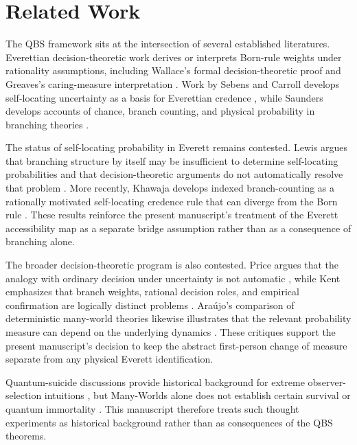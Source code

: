 \section{Related Work}

The QBS framework sits at the intersection of several established literatures. Everettian decision-theoretic work derives or interprets Born-rule weights under rationality assumptions, including Wallace's formal decision-theoretic proof \cite{wallace2009born} and Greaves's caring-measure interpretation \cite{greaves2004deutsch}. Work by Sebens and Carroll develops self-locating uncertainty as a basis for Everettian credence \cite{sebenscarroll2018selflocating}, while Saunders develops accounts of chance, branch counting, and physical probability in branching theories \cite{saunders2010chance,saunders2021probability,saunders2021branchcounting,saunders2026physicalprobability}.

The status of self-locating probability in Everett remains contested. Lewis argues that branching structure by itself may be insufficient to determine self-locating probabilities and that decision-theoretic arguments do not automatically resolve that problem \cite{lewis2009selflocation}. More recently, Khawaja develops indexed branch-counting as a rationally motivated self-locating credence rule that can diverge from the Born rule \cite{khawaja2026branchcounting}. These results reinforce the present manuscript's treatment of the Everett accessibility map as a separate bridge assumption rather than as a consequence of branching alone.

The broader decision-theoretic program is also contested. Price argues that the analogy with ordinary decision under uncertainty is not automatic \cite{price2006probability,price2010decisions}, while Kent emphasizes that branch weights, rational decision roles, and empirical confirmation are logically distinct problems \cite{kent2010oneworld}. Ara\'ujo's comparison of deterministic many-world theories likewise illustrates that the relevant probability measure can depend on the underlying dynamics \cite{araujo2019deterministic}. These critiques support the present manuscript's decision to keep the abstract first-person change of measure separate from any physical Everett identification.

Quantum-suicide discussions provide historical background for extreme observer-selection intuitions \cite{tegmark1997manywords}, but Many-Worlds alone does not establish certain survival or quantum immortality \cite{mallah2009immortality}. This manuscript therefore treats such thought experiments as historical background rather than as consequences of the QBS theorems.

